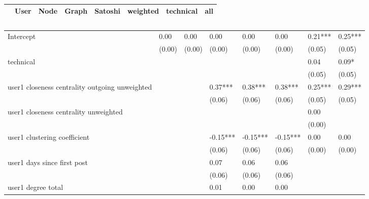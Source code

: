 \begin{table}
\caption{}
\begin{center}
\begin{tabular}{lccccccc}
\hline
                                               &   User  &   Node  &  Graph   & Satoshi  & weighted & technical &   all    \\
\hline
\hline
\end{tabular}
\begin{tabular}{llllllll}
Intercept                                      & 0.00    & 0.00    & 0.00     & 0.00     & 0.00     & 0.21***   & 0.25***  \\
                                               & (0.00)  & (0.00)  & (0.00)   & (0.00)   & (0.00)   & (0.05)    & (0.05)   \\
technical                                      &         &         &          &          &          & 0.04      & 0.09*    \\
                                               &         &         &          &          &          & (0.05)    & (0.05)   \\
user1 closeness centrality outgoing unweighted &         &         & 0.37***  & 0.38***  & 0.38***  & 0.25***   & 0.29***  \\
                                               &         &         & (0.06)   & (0.06)   & (0.06)   & (0.05)    & (0.05)   \\
user1 closeness centrality unweighted          &         &         &          &          &          & 0.00      &          \\
                                               &         &         &          &          &          & (0.00)    &          \\
user1 clustering coefficient                   &         &         & -0.15*** & -0.15*** & -0.15*** & 0.00      & 0.00     \\
                                               &         &         & (0.06)   & (0.06)   & (0.06)   & (0.00)    & (0.00)   \\
user1 days since first post                    &         &         & 0.07     & 0.06     & 0.06     &           &          \\
                                               &         &         & (0.06)   & (0.06)   & (0.06)   &           &          \\
user1 degree total                             &         &         & 0.01     & 0.00     & 0.00     &           &          \\

\end{tabular}
\end{center}
\end{table}
